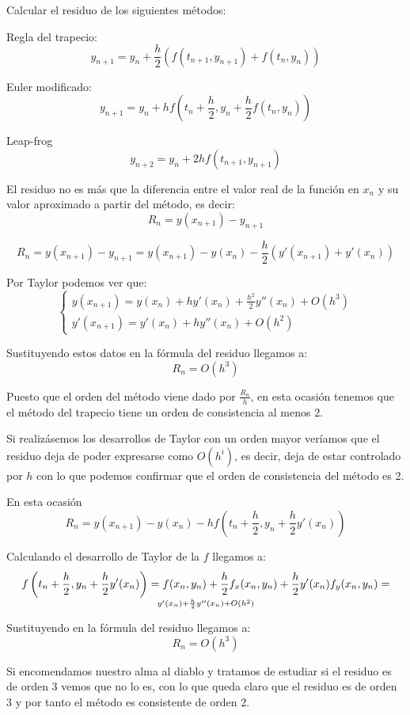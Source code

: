 \begin{problem}[4]
Calcular el residuo de los siguientes métodos:

\ppart Regla del trapecio:
\[y_{n+1} = y_n + \frac{h}{2}\left( f(t_{n+1},y_{n+1})+f(t_n,y_n)\right)\]

\ppart Euler modificado:
\[y_{n+1} = y_n +hf\left( t_n+\frac{h}{2}, y_n+\frac{h}{2}f(t_n,y_n)\right)\]

\ppart Leap-frog
\[y_{n+2}=y_n+2hf(t_{n+1},y_{n+1})\]
\solution


El residuo no es más que la diferencia entre el valor real de la función en $x_n$ y su valor aproximado a partir del método, es decir:
\[R_n = y(x_{n+1})-y_{n+1}\]

\spart
\[R_n = y(x_{n+1})-y_{n+1} = y(x_{n+1})-y(x_n) - \frac{h}{2}\left( y'(x_{n+1})+y'(x_n)\right)\]

Por Taylor podemos ver que:
\[\left\{\begin{array}{l}
y(x_{n+1}) = y(x_n)+hy'(x_n)+\frac{h^2}{2}y''(x_n)+O(h^3) \\
y'(x_{n+1}) = y'(x_n)+hy''(x_n) +O(h^2)
\end{array}\right.\]

Sustituyendo estos datos en la fórmula del residuo llegamos a:
\[R_n = O(h^3)\]

Puesto que el orden del método viene dado por $\frac{R_n}{h}$, en esta ocasión tenemos que el método del trapecio tiene un orden de consistencia al menos $2$.

Si realizásemos los desarrollos de Taylor con un orden mayor veríamos que el residuo deja de poder expresarse como $O(h^i)$, es decir, deja de estar controlado por $h$ con lo que podemos confirmar que el orden de consistencia del método es 2.

\spart

En esta ocasión
\[R_n = y(x_{n+1})-y(x_n)-hf\left( t_n+\frac{h}{2}, y_n+\frac{h}{2}y'(x_n)\right)\]

Calculando el desarrollo de Taylor de la $f$ llegamos a:
\[f\left( t_n+\frac{h}{2}, y_n+\frac{h}{2}y'(x_n)\right) = f(x_n,y_n)+\frac{h}{2}f_x(x_n,y_n)+\frac{h}{2}y'(x_n)f_y(x_n,y_n)= \atop y'(x_n)+\frac{h}{2}y''(x_n)+O(h^2)\]

Sustituyendo en la fórmula del residuo llegamos a:
\[R_n = O(h^3)\]

Si encomendamos nuestro alma al diablo y tratamos de estudiar si el residuo es de orden 3 vemos que no lo es, con lo que queda claro que el residuo es de orden 3 y por tanto el método es consistente de orden 2.


\end{problem}
